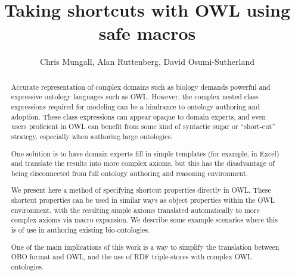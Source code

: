 \documentclass{llncs}
\begin{document}
%
\frontmatter          %

\title{Taking shortcuts with OWL using safe macros}

\author{Chris Mungall, Alan Ruttenberg, David Osumi-Sutherland}


\maketitle              %

\begin{abstract}

Accurate representation of complex domains such as biology demands
powerful and expressive ontology languages such as OWL. However, the
complex nested class expressions required for modeling can be a
hindrance to ontology authoring and adoption. These class expressions
can appear opaque to domain experts, and even users proficient in OWL
can benefit from some kind of syntactic sugar or ``short-cut''
strategy, especially when authoring large ontologies.

One solution is to have domain experts fill in simple templates (for
example, in Excel) and translate the results into more complex axioms,
but this has the disadvantage of being disconnected from full ontology
authoring and reasoning environment.

We present here a method of specifying shortcut properties directly in
OWL. These shortcut properties can be used in similar ways as object
properties within the OWL environment, with the resulting simple
axioms translated automatically to more complex axioms via macro
expansion. We describe some example scenarios where this is of use in
authoring existing bio-ontologies.

One of the main implications of this work is a way to simplify the
translation between OBO format and OWL, and the use of RDF
triple-stores with complex OWL ontologies.

\end{abstract}
\end{document}
